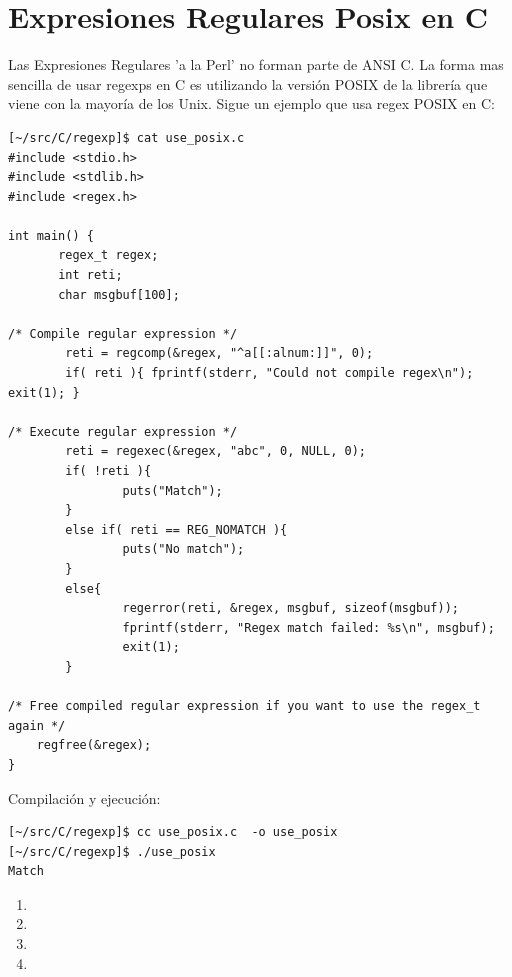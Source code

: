 \section{Expresiones Regulares Posix en C}
Las Expresiones Regulares 'a la Perl' no forman parte de ANSI C. 
La forma mas sencilla de usar regexps en C es utilizando la versión POSIX de la
librería que viene con la mayoría de los Unix.
Sigue un ejemplo que usa regex POSIX en C:
\begin{verbatim}
[~/src/C/regexp]$ cat use_posix.c 
#include <stdio.h>
#include <stdlib.h>
#include <regex.h>        

int main() {
       regex_t regex;
       int reti;
       char msgbuf[100];

/* Compile regular expression */
        reti = regcomp(&regex, "^a[[:alnum:]]", 0);
        if( reti ){ fprintf(stderr, "Could not compile regex\n"); exit(1); }

/* Execute regular expression */
        reti = regexec(&regex, "abc", 0, NULL, 0);
        if( !reti ){
                puts("Match");
        }
        else if( reti == REG_NOMATCH ){
                puts("No match");
        }
        else{
                regerror(reti, &regex, msgbuf, sizeof(msgbuf));
                fprintf(stderr, "Regex match failed: %s\n", msgbuf);
                exit(1);
        }

/* Free compiled regular expression if you want to use the regex_t again */
    regfree(&regex);
}
\end{verbatim}
Compilación y ejecución:
\begin{verbatim}
[~/src/C/regexp]$ cc use_posix.c  -o use_posix
[~/src/C/regexp]$ ./use_posix 
Match
\end{verbatim}


\begin{enumerate}
\item 
{}
\item 
{}
\item 
{}
\item 
{}
\end{enumerate}
